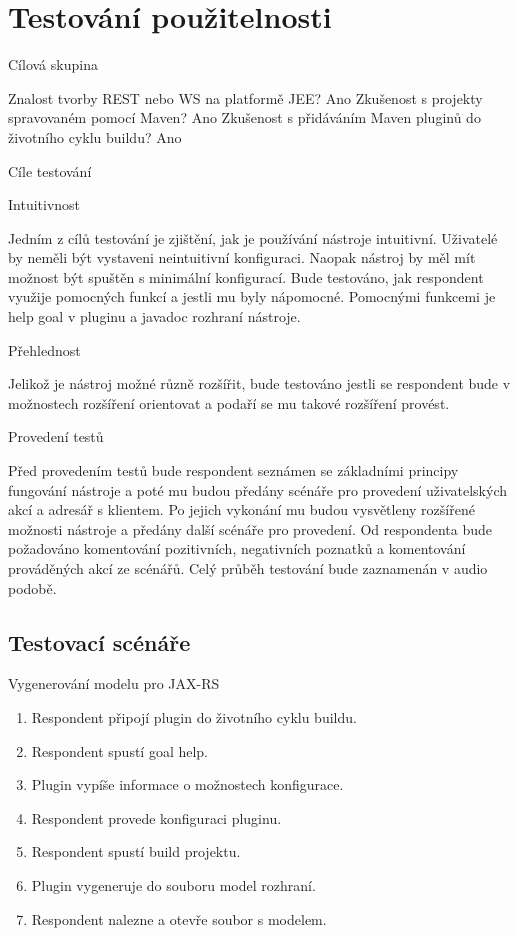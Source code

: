 \documentclass[11pt,twoside,a4paper]{book}
\begin{document}
\section{Testování použitelnosti}

Cílová skupina

Znalost tvorby REST nebo WS na platformě JEE? Ano
Zkušenost s projekty spravovaném pomocí Maven? Ano
Zkušenost s přidáváním Maven pluginů do životního cyklu buildu? Ano

Cíle testování

Intuitivnost

Jedním z cílů testování je zjištění, jak je používání nástroje intuitivní. Uživatelé by neměli být
vystaveni neintuitivní konfiguraci. Naopak nástroj by měl mít možnost být spuštěn s
minimální konfigurací. Bude testováno, jak respondent využije pomocných funkcí a jestli mu
byly nápomocné. Pomocnými funkcemi je help goal v pluginu a javadoc rozhraní nástroje.

Přehlednost

Jelikož je nástroj možné různě rozšířit, bude testováno jestli se respondent bude v možnostech
rozšíření orientovat a podaří se mu takové rozšíření provést.

Provedení testů

Před provedením testů bude respondent seznámen se základními principy fungování nástroje a
poté mu budou předány scénáře pro provedení uživatelských akcí a adresář s klientem. Po
jejich vykonání mu budou vysvětleny rozšířené možnosti nástroje a předány další scénáře pro
provedení. Od respondenta bude požadováno komentování pozitivních, negativních poznatků
a komentování prováděných akcí ze scénářů. Celý průběh testování bude zaznamenán v audio
podobě.

\subsection{Testovací scénáře}

Vygenerování modelu pro JAX-RS

\begin{enumerate}
  \item Respondent připojí plugin do životního cyklu buildu.
  
  \item Respondent spustí goal help.
  
  \item Plugin vypíše informace o možnostech konfigurace.
  
  \item Respondent provede konfiguraci pluginu.
  
  \item Respondent spustí build projektu.
  
  \item Plugin vygeneruje do souboru model rozhraní.
  
  \item Respondent nalezne a otevře soubor s modelem.
\end{enumerate}
\end{document}
